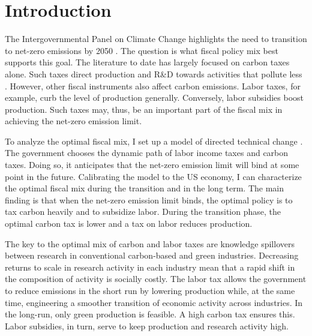 \thispagestyle{empty}
\clearpage
\setcounter{page}{1}
\section{Introduction}




The Intergovernmental Panel on Climate Change highlights the need to transition to net-zero emissions by 2050 \citep{IPCC2022}. The question is what fiscal policy mix best supports this goal. The literature to date has largely focused on carbon taxes alone. Such taxes direct production and R\&D towards activities that pollute less \citep{Acemoglu2012TheChange}. However, other fiscal instruments also affect carbon emissions. Labor taxes, for example, curb the level of production generally. Conversely, labor subsidies  boost production. Such taxes may, thus, be an important part of the fiscal mix in achieving the  net-zero emission limit.

To analyze the optimal fiscal mix, I set up a model of directed technical change \citep{Acemoglu2002DirectedChange, Acemoglu2012TheChange}. The government chooses the dynamic path of labor income taxes and carbon taxes. Doing so, it anticipates that the net-zero emission limit will bind at some point in the future. Calibrating the model to the US economy, I can characterize the optimal fiscal mix during the transition and in the long term. The main finding is that when the net-zero emission limit binds, the optimal policy is to tax carbon heavily and to subsidize labor. During the transition phase, the optimal carbon tax is lower and a tax on labor reduces production. 

The key to the optimal mix of carbon and labor taxes are knowledge spillovers between research in conventional carbon-based and green industries. Decreasing returns to scale in research activity in each industry mean that a rapid shift in the composition of activity is socially costly. The labor tax allows the government to reduce emissions in the short run by  lowering production while, at the same time, engineering a smoother transition of economic activity across industries. In the long-run, only green production is feasible. A high carbon tax ensures this. Labor subsidies, in turn, serve to keep production and research activity high.

